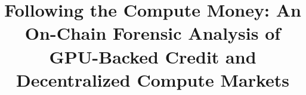 \documentclass[conference]{IEEEtran}
\begin{document}
\title{Following the Compute Money: An On-Chain Forensic Analysis of GPU-Backed Credit and Decentralized Compute Markets}

\author{
}

\maketitle




\balance


\end{document}
